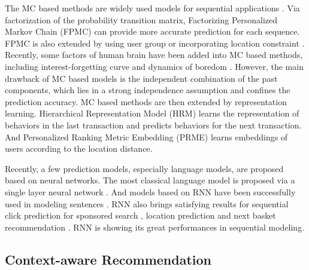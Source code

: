 \documentclass{sig-alternate}
\begin{document}
The MC based methods are widely used models for sequential applications \cite{yang2010personalizing}. Via factorization of the probability transition matrix, Factorizing Personalized Markov Chain (FPMC) \cite{rendle2010factorizing} can provide more accurate prediction for each sequence. FPMC is also extended by using user group \cite{natarajan2013app} or incorporating location constraint \cite{cheng2013you}. Recently, some factors of human brain have been added into MC based methods, including interest-forgetting curve \cite{chen2015personalized} and dynamics of boredom \cite{kapoor2015just}. However, the main drawback of MC based models is the independent combination of the past components, which lies in a strong independence assumption and confines the prediction accuracy. MC based methods are then extended by representation learning. Hierarchical Representation Model (HRM) \cite{wang2015learning} learns the representation of behaviors in the last transaction and predicts behaviors for the next transaction. And Personalized Ranking Metric Embedding (PRME) \cite{feng2015personalized} learns embeddings of users according to the location distance.

Recently, a few prediction models, especially language models, are proposed based on neural networks. The most classical language model is proposed via a single layer neural network \cite{bengio2003neural}. And models based on RNN have been successfully used in modeling sentences \cite{mikolov2010recurrent,mikolov2011extensions,mikolov2011rnnlm}. RNN also brings satisfying results for sequential click prediction for sponsored search \cite{zhang2014sequential}, location prediction \cite{liu2016strnn} and next basket recommendation \cite{yu2016dream}. RNN is showing its great performances in sequential modeling.

\subsection{Context-aware Recommendation}
\end{document}
